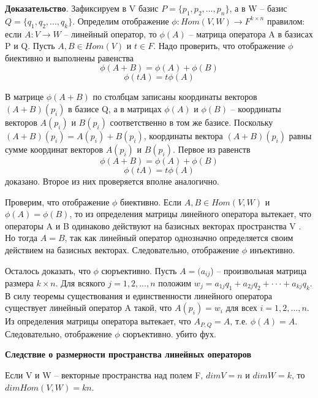\documentclass[a4paper]{article}
\begin{document}
\begin{hproof}
\textbf{Доказательство}. Зафиксируем в V базис $P = \{ p_1, p_2, . . . , p_n \}$, а в W –
базис $Q = \{ q_1, q_2, . . . , q_k \}$. Определим отображение
$\phi: Hom(V, W) \rightarrow F^{k \times n}$
правилом: если $A: V \rightarrow W$ – линейный оператор,
то $\phi(A)$ – матрица оператора A в базисах P и Q. Пусть $A, B \in Hom(V)$ и
$t \in F$. Надо проверить, что отображение $\phi$ биективно и выполнены равенства \begin{equation}
\phi (A+B) = \phi(A) + \phi(B)
\end{equation}
\begin{equation}
\phi(tA) = t \phi(A)
\end{equation}

В матрице $\phi(A+B)$ по столбцам записаны координаты векторов
$(A + B)(p_i)$ в базисе Q, а в матрицах $\phi(A)$ и $\phi(B)$ – координаты векторов
$A(p_i)$ и $B(p_i)$ соответственно в том же базисе. Поскольку
$(A + B)(p_i) = A(p_i) + B(p_i)$, координаты вектора $(A + B)(p_i)$ равны
сумме координат векторов $A(p_i)$ и $B(p_i)$. Первое из равенств \begin{equation}
\phi (A+B) = \phi(A) + \phi(B)
\end{equation}
\begin{equation}
\phi(tA) = t \phi(A)
\end{equation}
доказано. Второе из них проверяется вполне аналогично.

Проверим, что отображение $\phi$ биективно. Если $A, B \in Hom(V, W)$ и
$\phi(A) = \phi(B)$, то из определения матрицы линейного оператора вытекает,
что операторы A и B одинаково действуют на базисных векторах
пространства V . Но тогда $A = B$, так как линейный оператор однозначно
определяется своим действием на базисных векторах. Следовательно,
отображение $\phi$ инъективно.

Осталось доказать, что $\phi$ сюръективно. Пусть $A = (a_{ij}$) – произвольная
матрица размера $k \times n$. Для всякого $j = 1, 2, . . . , n$ положим
$w_j = a_{1j}q_1 + a_{2j}q_2 + · · · + a_{kj}q_k$. В силу теоремы существования и
единственности линейного оператора существует линейный оператор A
такой, что $A(p_i) = w_i$ для всех $i = 1, 2, . . . , n$. Из определения матрицы
оператора вытекает, что $A_{P,Q} = A$, т.е. $\phi(A) = A$. Следовательно, отображение $\phi$ сюръективно. убито фух.
\end{hproof}

\begin{htheorem}
\textbf{Следствие о размерности пространства линейных операторов}

Если V и W – векторные пространства над полем F, $dim V = n$ и
$dim W = k$, то $dim Hom(V, W) = kn$.
\end{htheorem}
\end{document}
